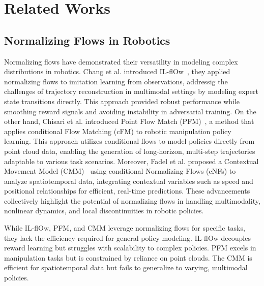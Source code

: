 \section{Related Works}
\label{section 2}
\subsection{Normalizing Flows in Robotics}

Normalizing flows have demonstrated their versatility in modeling complex distributions in robotics.
Chang et al. introduced IL-flOw~\cite{chang2021ilflow}, they applied normalizing flows to imitation learning from observations, addressig the challenges of trajectory reconstruction in multimodal settings by modeling expert state transitions directly.
This approach provided robust performance while smoothing reward signals and avoiding instability in adversarial training.
On the other hand, Chisari et al. introduced Point Flow Match (PFM)~\cite{chisari2024learning}, a method that applies conditional Flow Matching (cFM) to robotic manipulation policy learning. This approach utilizes conditional flows to model policies directly from point cloud data, enabling the generation of long-horizon, multi-step trajectories adaptable to various task scenarios.
Moreover, Fadel et al. proposed a Contextual Movement Model (CMM)~\cite{fadel2023contextual} using conditional Normalizing Flows (cNFs) to analyze spatiotemporal data, integrating contextual variables such as speed and positional relationships for efficient, real-time predictions. These advancements collectively highlight the potential of normalizing flows in handling multimodality, nonlinear dynamics, and local discontinuities in robotic policies.

While IL-flOw, PFM, and CMM leverage normalizing flows for specific tasks, they lack the efficiency required for general policy modeling. IL-flOw decouples reward learning but struggles with scalability to complex policies. PFM excels in manipulation tasks but is constrained by reliance on point clouds. The CMM is efficient for spatiotemporal data but fails to generalize to varying, multimodal policies. 



